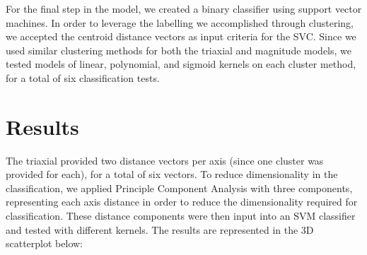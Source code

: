 \documentclass{llncs}
\begin{document}
    For the final step in the model, we created a binary classifier using support vector machines. In order to leverage the labelling we accomplished through clustering, we accepted the centroid distance vectors as input criteria for the SVC. Since we used similar clustering methods for both the triaxial and magnitude models, we tested models of linear, polynomial, and sigmoid kernels on each cluster method, for a total of six classification tests. 
    
\section{Results}
    
    The triaxial provided two distance vectors per axis (since one cluster was provided for each), for a total of six vectors. To reduce dimensionality in the classification, we applied Principle Component Analysis with three components, representing each axis distance in order to reduce the dimensionality required for classification. These distance components were then input into an SVM classifier and tested with different kernels. The results are represented in the 3D scatterplot below:
        
    
\end{document}
